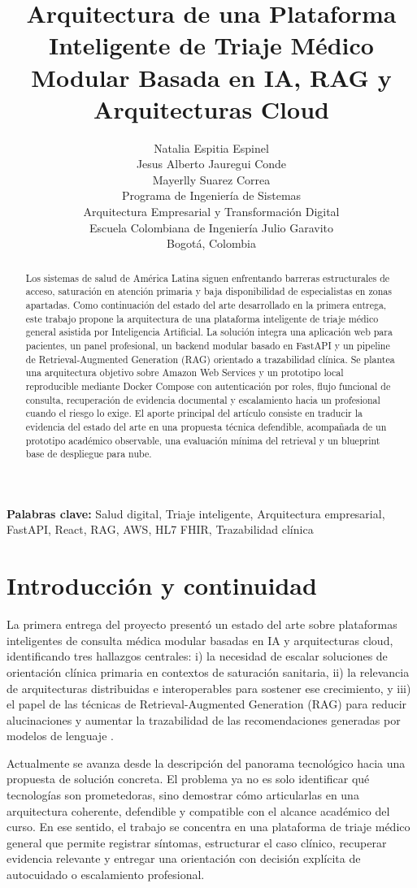 \documentclass[12pt]{article}
\title{Arquitectura de una Plataforma Inteligente de Triaje Médico Modular Basada en IA, RAG y Arquitecturas Cloud}
\author{
Natalia Espitia Espinel \\
Jesus Alberto Jauregui Conde \\
Mayerlly Suarez Correa \\
\small Programa de Ingeniería de Sistemas \\
\small Arquitectura Empresarial y Transformación Digital \\
\small Escuela Colombiana de Ingeniería Julio Garavito \\
\small Bogotá, Colombia
}
\date{}
\begin{document}
\maketitle

\begin{abstract}
Los sistemas de salud de América Latina siguen enfrentando barreras estructurales de acceso, saturación en atención primaria y baja disponibilidad de especialistas en zonas apartadas. Como continuación del estado del arte desarrollado en la primera entrega, este trabajo propone la arquitectura de una plataforma inteligente de triaje médico general asistida por Inteligencia Artificial. La solución integra una aplicación web para pacientes, un panel profesional, un backend modular basado en FastAPI y un pipeline de Retrieval-Augmented Generation (RAG) orientado a trazabilidad clínica. Se plantea una arquitectura objetivo sobre Amazon Web Services y un prototipo local reproducible mediante Docker Compose con autenticación por roles, flujo funcional de consulta, recuperación de evidencia documental y escalamiento hacia un profesional cuando el riesgo lo exige. El aporte principal del artículo consiste en traducir la evidencia del estado del arte en una propuesta técnica defendible, acompañada de un prototipo académico observable, una evaluación mínima del retrieval y un blueprint base de despliegue para nube.
\end{abstract}

\noindent\textbf{Palabras clave:} Salud digital, Triaje inteligente, Arquitectura empresarial, FastAPI, React, RAG, AWS, HL7 FHIR, Trazabilidad clínica

\section{Introducción y continuidad}

La primera entrega del proyecto presentó un estado del arte sobre plataformas inteligentes de consulta médica modular basadas en IA y arquitecturas cloud, identificando tres hallazgos centrales: i) la necesidad de escalar soluciones de orientación clínica primaria en contextos de saturación sanitaria, ii) la relevancia de arquitecturas distribuidas e interoperables para sostener ese crecimiento, y iii) el papel de las técnicas de Retrieval-Augmented Generation (RAG) para reducir alucinaciones y aumentar la trazabilidad de las recomendaciones generadas por modelos de lenguaje \cite{martinez2017, neha2024, who2025dhea, aws2024}.

Actualmente se avanza desde la descripción del panorama tecnológico hacia una propuesta de solución concreta. El problema ya no es solo identificar qué tecnologías son prometedoras, sino demostrar cómo articularlas en una arquitectura coherente, defendible y compatible con el alcance académico del curso. En ese sentido, el trabajo se concentra en una plataforma de triaje médico general que permite registrar síntomas, estructurar el caso clínico, recuperar evidencia relevante y entregar una orientación con decisión explícita de autocuidado o escalamiento profesional.
\end{document}
